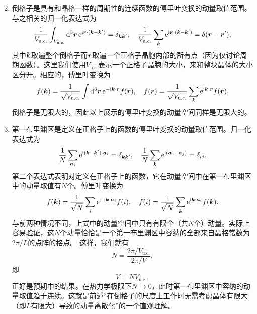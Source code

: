 \begin{enumerate}
\begin{equation}
    \end{equation}
    \item 倒格子是具有和晶格一样的周期性的连续函数的傅里叶变换的动量取值范围。与之相关的归一化表达式为
    \begin{equation}
        \frac{1}{V_\text{u.c.}} \int_{V_\text{u.c.}} \dd[3]{\vb*{r}} \mathrm{e}^{\mathrm{i} \vb*{r} \cdot (\vb*{k} - \vb*{k}')} = \delta_{\vb*{k} \vb*{k}'}, \quad \frac{1}{V_\text{u.c.}} \sum_{\vb*{k}} \mathrm{e}^{\mathrm{i} \vb*{r} \cdot (\vb*{k} - \vb*{k}')} = \delta(\vb*{r} - \vb*{r}'), 
        \label{eq:normalization-periodic}
    \end{equation}
    其中$\vb*{k}$取遍整个倒格子而$\vb*{r}$取遍一个正格子晶胞内部的所有点（因为仅讨论周期函数）。这里我们使用$V_\text{u.c.}$表示一个正格子晶胞的大小，来和整块晶体的大小区分开。相应的，傅里叶变换为
    \begin{equation}
        f(\vb*{k}) = \frac{1}{\sqrt{V_\text{u.c.}}} \int \dd[3]{\vb*{r}} \mathrm{e}^{- \mathrm{i} \vb*{k} \cdot \vb*{r}} f(\vb*{r}), \quad f(\vb*{r}) = \frac{1}{\sqrt{V_\text{u.c.}}} \sum_{\vb*{k}} \mathrm{e}^{\mathrm{i} \vb*{k} \cdot \vb*{r}} f(\vb*{r}).
    \end{equation}
    倒格子是无限大的，因此以上展示的傅里叶变换的动量空间同样是无限大的。
    \item 第一布里渊区是定义在正格子上的函数的傅里叶变换的动量取值范围。归一化表达式为
    \begin{equation}
        \frac{1}{N} \sum_{\vb*{a}_i} \mathrm{e}^{\mathrm{i} (\vb*{k} - \vb*{k}') \cdot \vb*{a}_i} = \delta_{\vb*{k} \vb*{k}'}, \quad \frac{1}{N} \sum_{\vb*{k}} \mathrm{e}^{\mathrm{i} (\vb*{a}_i - \vb*{a}_j)} = \delta_{ij}.
    \end{equation}
    第二个表达式表明对定义在正格子上的函数，它在动量空间中在第一布里渊区中的动量取值有$N$个。傅里叶变换为
    \begin{equation}
        f(\vb*{k}) = \frac{1}{\sqrt{N}} \sum_{i} \mathrm{e}^{- \mathrm{i} \vb*{k} \cdot \vb*{a}_i} f(i), \quad f(i) = \frac{1}{\sqrt{N}} \sum_{\vb*{k}} \mathrm{e}^{\mathrm{i} \vb*{k} \cdot \vb*{a}_i} f(\vb*{k}).
    \end{equation}
    与前两种情况不同，上式中的动量空间中只有有限个（共$N$个）动量。实际上容易验证，这$N$个动量恰恰是一个第一布里渊区中容纳的全部来自晶格常数为$2\pi / L$的点阵的格点。
    这样，我们就有
    \[
        N = \frac{2\pi / V_\text{u.c.}}{2\pi / V},
    \]
    即
    \begin{equation}
        V = N V_\text{u.c.},
    \end{equation}
    正好是预期中的结果。在热力学极限下$N \to 0$，此时第一布里渊区中容纳的动量取值趋于连续。这就是前述“在倒格子的尺度上工作时无需考虑晶体有限大（即$L$有限大）导致的动量离散化”的一个直观理解。
\end{enumerate}

